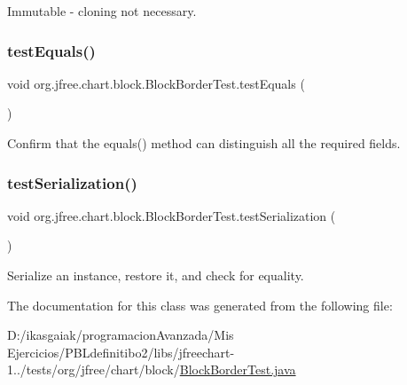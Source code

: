 Immutable -\/ cloning not necessary. \mbox{\label{classorg_1_1jfree_1_1chart_1_1block_1_1_block_border_test_a6e535c3882d5788aebd5ba8b598e3c02}} 
\subsubsection{\texorpdfstring{test\+Equals()}{testEquals()}}
{\footnotesize\ttfamily void org.\+jfree.\+chart.\+block.\+Block\+Border\+Test.\+test\+Equals (\begin{DoxyParamCaption}{ }\end{DoxyParamCaption})}

Confirm that the equals() method can distinguish all the required fields. \mbox{\label{classorg_1_1jfree_1_1chart_1_1block_1_1_block_border_test_a032b24b65ef430324a3638e419e9f004}} 
\subsubsection{\texorpdfstring{test\+Serialization()}{testSerialization()}}
{\footnotesize\ttfamily void org.\+jfree.\+chart.\+block.\+Block\+Border\+Test.\+test\+Serialization (\begin{DoxyParamCaption}{ }\end{DoxyParamCaption})}

Serialize an instance, restore it, and check for equality. 

The documentation for this class was generated from the following file\+:\begin{DoxyCompactItemize}
\item 
D\+:/ikasgaiak/programacion\+Avanzada/\+Mis Ejercicios/\+P\+B\+Ldefinitibo2/libs/jfreechart-\/1../tests/org/jfree/chart/block/\mbox{\hyperlink{_block_border_test_8java}{Block\+Border\+Test.\+java}}\end{DoxyCompactItemize}
